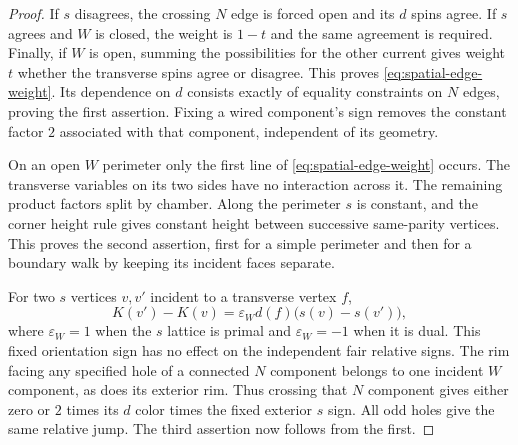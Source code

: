 \begin{proof}
If $s$ disagrees, the crossing $N$ edge is forced open and its $d$ spins
agree. If $s$ agrees and $W$ is closed, the weight is $1-t$ and the same
agreement is required. Finally, if $W$ is open, summing the possibilities
for the other current gives weight $t$ whether the transverse spins agree
or disagree. This proves \eqref{eq:spatial-edge-weight}. Its dependence on
$d$ consists exactly of equality constraints on $N$ edges, proving the
first assertion. Fixing a wired component's sign removes the constant
factor $2$ associated with that component, independent of its geometry.

On an open $W$ perimeter only the first line of
\eqref{eq:spatial-edge-weight} occurs. The transverse variables on its
two sides have no interaction across it. The remaining product factors
split by chamber. Along the perimeter $s$ is constant, and the corner
height rule gives constant height between successive same-parity
vertices. This proves the second assertion, first for a simple perimeter
and then for a boundary walk by keeping its incident faces separate.

For two $s$ vertices $v,v'$ incident to a transverse vertex $f$,
\begin{equation}\label{eq:spatial-height-jump}
 K(v')-K(v)=\varepsilon_W d(f)\bigl(s(v)-s(v')\bigr),
\end{equation}
where $\varepsilon_W=1$ when the $s$ lattice is primal and
$\varepsilon_W=-1$ when it is dual. This fixed orientation sign has
no effect on the independent fair relative signs.
The rim facing any specified hole of a connected $N$ component belongs
to one incident $W$ component, as does its exterior rim. Thus crossing
that $N$ component gives either zero or $2$ times its $d$ color times
the fixed exterior $s$ sign. All odd holes give the same relative jump.
The third assertion now follows from the first.


\end{proof}
